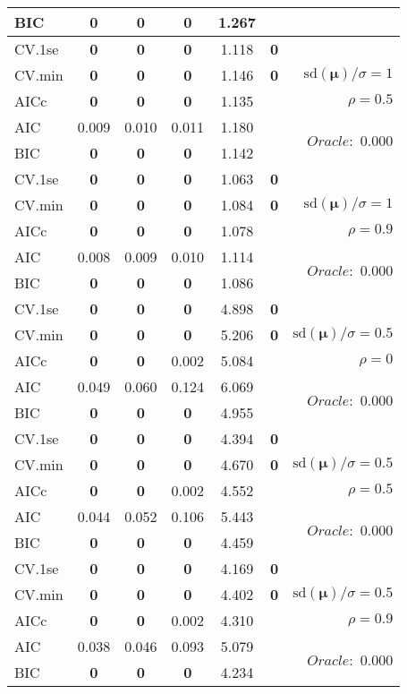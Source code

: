 \begin{table}
\begin{center}
\begin{tabular}{l*{5}{c}|r}
BIC & {\bf 0} & {\bf 0} & {\bf 0} & 1.267 & &  \\
 \hline 
CV.1se & {\bf 0} & {\bf 0} & {\bf 0} & 1.118 & {\bf 0} & \\
CV.min & {\bf 0} & {\bf 0} & {\bf 0} & 1.146 & {\bf 0} &  $\mathrm{sd}(\mathbf{\mu})/\sigma=1$ \\
AICc & {\bf 0} & {\bf 0} & {\bf 0} & 1.135 & & $\rho=0.5$ \\
AIC & 0.009 & 0.010 & 0.011 & 1.180 & &  \multirow{2}{*}{$Oracle: $ 0.000} \\
BIC & {\bf 0} & {\bf 0} & {\bf 0} & 1.142 & &  \\
 \hline 
CV.1se & {\bf 0} & {\bf 0} & {\bf 0} & 1.063 & {\bf 0} & \\
CV.min & {\bf 0} & {\bf 0} & {\bf 0} & 1.084 & {\bf 0} &  $\mathrm{sd}(\mathbf{\mu})/\sigma=1$ \\
AICc & {\bf 0} & {\bf 0} & {\bf 0} & 1.078 & & $\rho=0.9$ \\
AIC & 0.008 & 0.009 & 0.010 & 1.114 & &  \multirow{2}{*}{$Oracle: $ 0.000} \\
BIC & {\bf 0} & {\bf 0} & {\bf 0} & 1.086 & &  \\
 \hline 
CV.1se & {\bf 0} & {\bf 0} & {\bf 0} & 4.898 & {\bf 0} & \\
CV.min & {\bf 0} & {\bf 0} & {\bf 0} & 5.206 & {\bf 0} &  $\mathrm{sd}(\mathbf{\mu})/\sigma=0.5$ \\
AICc & {\bf 0} & {\bf 0} & 0.002 & 5.084 & & $\rho=0$ \\
AIC & 0.049 & 0.060 & 0.124 & 6.069 & &  \multirow{2}{*}{$Oracle: $ 0.000} \\
BIC & {\bf 0} & {\bf 0} & {\bf 0} & 4.955 & &  \\
 \hline 
CV.1se & {\bf 0} & {\bf 0} & {\bf 0} & 4.394 & {\bf 0} & \\
CV.min & {\bf 0} & {\bf 0} & {\bf 0} & 4.670 & {\bf 0} &  $\mathrm{sd}(\mathbf{\mu})/\sigma=0.5$ \\
AICc & {\bf 0} & {\bf 0} & 0.002 & 4.552 & & $\rho=0.5$ \\
AIC & 0.044 & 0.052 & 0.106 & 5.443 & &  \multirow{2}{*}{$Oracle: $ 0.000} \\
BIC & {\bf 0} & {\bf 0} & {\bf 0} & 4.459 & &  \\
 \hline 
CV.1se & {\bf 0} & {\bf 0} & {\bf 0} & 4.169 & {\bf 0} & \\
CV.min & {\bf 0} & {\bf 0} & {\bf 0} & 4.402 & {\bf 0} &  $\mathrm{sd}(\mathbf{\mu})/\sigma=0.5$ \\
AICc & {\bf 0} & {\bf 0} & 0.002 & 4.310 & & $\rho=0.9$ \\
AIC & 0.038 & 0.046 & 0.093 & 5.079 & &  \multirow{2}{*}{$Oracle: $ 0.000} \\
BIC & {\bf 0} & {\bf 0} & {\bf 0} & 4.234 & &  \\
 \hline 
\end{tabular}
\end{center}
\vspace{-1cm}
\end{table}




